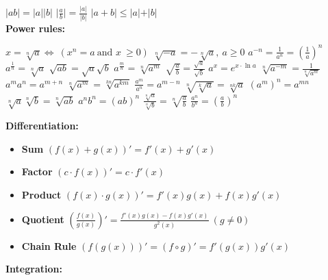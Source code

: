 \documentclass[]{article}
\begin{document}
\begin{multicols*}{3}
  $\vert ab \vert = \vert a \vert \vert b\vert $  
  $\vert \frac{a}{b} \vert = \frac{\vert a \vert}{ \vert b\vert} $ 
  $\vert a + b \vert \le \vert a \vert + \vert b \vert$ \\

\textbf{Power rules:}

$x = \sqrt[n]{a} \Leftrightarrow\ (x^{n} = a \ \text{and } x \ \ge 0)$ \;
$\sqrt[n]{-a} = - \sqrt[n]{a}, \ a \ge 0$ \;
$a^{-n} = \frac{1}{a^{n}} = (\frac{1}{a})^{n}$ \;
$a^{\frac{1}{n}} = \sqrt[n]{a}$ \;
$\sqrt{ab} = \sqrt{a}\sqrt{b}$ \;
$a^{\frac{m}{n}} = \sqrt[n]{a^{m}}$ \;
$ \sqrt{\frac{a}{b}} = \frac{\sqrt{a}}{\sqrt{b}} $ \;
$ a^{x} = e^{x \cdot \ln a}$ \;
$\sqrt[n]{a^{-m}} = \frac{1}{\sqrt[n]{a^{m}}}$ \;
$a^{m}a^{n} = a^{m+n} $ \;
$\sqrt[n]{a^{m}} = \sqrt[kn]{a^{km}}$ \;
$\frac{a^{m}}{a^{n}} = a^{m-n}$ \;
$ \sqrt[n]{\sqrt[k]{a}} = \sqrt[nk]{a}$ \;
$(a^{m})^{n} = a^{mn}$ \;
$\sqrt[n]{a}\sqrt[n]{b} = \sqrt[n]{ab}$  \;
$a^{n}b^{n} = (ab)^{n}$ \;
$\frac{\sqrt[n]{a}}{\sqrt[n]{b}} = \sqrt[n]{\frac{a}{b}}$  \;
$\frac{a^{n}}{b^{n}} = (\frac{a}{b})^{n}$  \;

\textbf{Differentiation:}

\begin{itemize}
  \item \textbf{Sum} $(f(x)+g(x))' = f'(x) + g'(x)$
  \item \textbf{Factor} $(c\cdot f(x))' = c\cdot f'(x)$
  \item \textbf{Product} $(f(x)\cdot g(x))' = f'(x)g(x) + f(x)g'(x)$
  \item \textbf{Quotient} $\left(\frac{f(x)}{g(x)}\right)' = \frac{f'(x)g(x) - f(x)g'(x)}{g^2(x)} \ (g\neq 0)$
  \item \textbf{Chain Rule} $(f(g(x)))' = (f\circ g)' = f'(g(x))g'(x)$
\end{itemize}

\textbf{Integration:}


\end{multicols*}
\end{document}
